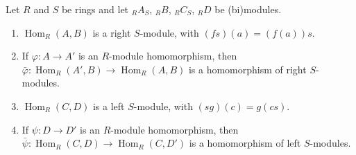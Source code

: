 Let $R$ and $S$ be rings and let ${}_R A_S$, ${}_R B$, ${}_R C_S$, ${}_R D$ be (bi)modules.
\begin{enumerate}
\item[(i)] $\operatorname{Hom}_R(A,B)$ is a right $S$-module, with $(fs)(a) = (f(a))s$.
\item[(ii)] If $\varphi : A \to A'$ is an $R$-module homomorphism, then $\bar{\varphi} : \operatorname{Hom}_R(A',B) \to \operatorname{Hom}_R(A,B)$ is a homomorphism of right $S$-modules.
\item[(iii)] $\operatorname{Hom}_R(C,D)$ is a left $S$-module, with $(sg)(c) = g(cs)$.
\item[(iv)] If $\psi : D \to D'$ is an $R$-module homomorphism, then $\bar{\psi} : \operatorname{Hom}_R(C,D) \to \operatorname{Hom}_R(C,D')$ is a homomorphism of left $S$-modules.
\end{enumerate}
